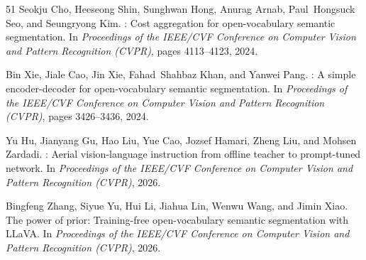 \begin{thebibliography}{51}
Seokju Cho, Heeseong Shin, Sunghwan Hong, Anurag Arnab, Paul~Hongsuck Seo,
  and Seungryong Kim.
: Cost aggregation for open-vocabulary semantic
  segmentation.
\newblock In \emph{Proceedings of the IEEE/CVF Conference on Computer Vision
  and Pattern Recognition (CVPR)}, pages 4113--4123, 2024.
\newblock {}

Bin Xie, Jiale Cao, Jin Xie, Fahad~Shahbaz Khan, and Yanwei Pang.
: A simple encoder-decoder for open-vocabulary semantic
  segmentation.
\newblock In \emph{Proceedings of the IEEE/CVF Conference on Computer Vision
  and Pattern Recognition (CVPR)}, pages 3426--3436, 2024.
\newblock {}

Yu Hu, Jianyang Gu, Hao Liu, Yue Cao, Jozsef Hamari, Zheng Liu, and Mohsen
  Zardadi.
: Aerial vision-language instruction from offline teacher to
  prompt-tuned network.
\newblock In \emph{Proceedings of the IEEE/CVF Conference on Computer Vision
  and Pattern Recognition (CVPR)}, 2026.

Bingfeng Zhang, Siyue Yu, Hui Li, Jiahua Lin, Wenwu Wang, and Jimin Xiao.
\newblock The power of prior: Training-free open-vocabulary semantic
  segmentation with {LLaVA}.
\newblock In \emph{Proceedings of the IEEE/CVF Conference on Computer Vision
  and Pattern Recognition (CVPR)}, 2026.

\end{thebibliography}


